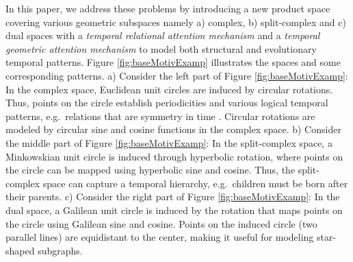 \documentclass[letterpaper]{article} %
\begin{document}
In this paper, we address these problems by introducing a new product space covering various geometric subspaces namely a) complex, b) split-complex and c) dual spaces with a \emph{temporal relational attention mechanism} and a \emph{temporal geometric attention mechanism} to model both structural and evolutionary temporal patterns. Figure \ref{fig:baseMotivExamp} illustrates the spaces and some corresponding patterns.
a) Consider the left part of Figure \ref{fig:baseMotivExamp}: 
In the complex space, Euclidean unit circles are induced by circular rotations.
Thus, points on the circle establish periodicities and various logical temporal patterns, e.g.\ relations that are symmetry in time \cite{xu2020tero}. 
Circular rotations are modeled by circular sine and cosine functions in the complex space. 
b) Consider the middle part of Figure \ref{fig:baseMotivExamp}: 
In the split-complex space, a Minkowskian unit circle is induced through hyperbolic rotation, where points on the circle can be mapped using hyperbolic sine and cosine.
Thus, the split-complex space can capture a temporal hierarchy, e.g.\ children must be born after their parents.
c) Consider the right part of Figure \ref{fig:baseMotivExamp}:
In the dual space, a Galilean unit circle is induced by the rotation that maps points on the circle using Galilean sine and cosine.
Points on the induced circle (two parallel lines) are equidistant to the center, making it useful for modeling star-shaped subgraphs.
\end{document}
